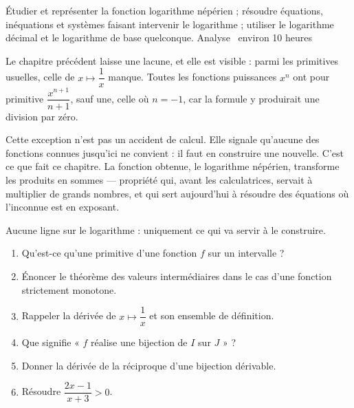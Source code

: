   {Étudier et représenter la fonction logarithme népérien ; résoudre
   équations, inéquations et systèmes faisant intervenir le logarithme ;
   utiliser le logarithme décimal et le logarithme de base quelconque.}
  {Analyse \textbullet\ environ 10 heures}

Le chapitre précédent laisse une lacune, et elle est visible : parmi les
primitives usuelles, celle de $x \mapsto \dfrac{1}{x}$ manque. Toutes les
fonctions puissances $x^{n}$ ont pour primitive $\dfrac{x^{n+1}}{n+1}$, sauf
une, celle où $n = -1$, car la formule y produirait une division par zéro.

Cette exception n'est pas un accident de calcul. Elle signale qu'aucune des
fonctions connues jusqu'ici ne convient : il faut en construire une nouvelle.
C'est ce que fait ce chapitre. La fonction obtenue, le logarithme népérien,
transforme les produits en sommes — propriété qui, avant les calculatrices,
servait à multiplier de grands nombres, et qui sert aujourd'hui à résoudre des
équations où l'inconnue est en exposant.

\begin{revision}
Aucune ligne sur le logarithme : uniquement ce qui va servir à le construire.

\begin{enumerate}[label=\textbf{\arabic*.}, leftmargin=*, itemsep=0.35em]
  \item Qu'est-ce qu'une primitive d'une fonction $f$ sur un intervalle ?
  \item Énoncer le théorème des valeurs intermédiaires dans le cas d'une
        fonction strictement monotone.
  \item Rappeler la dérivée de $x \mapsto \dfrac{1}{x}$ et son ensemble de
        définition.
  \item Que signifie « $f$ réalise une bijection de $I$ sur $J$ » ?
  \item Donner la dérivée de la réciproque d'une bijection dérivable.
  \item Résoudre $\dfrac{2x-1}{x+3} > 0$.
\end{enumerate}
\end{revision}


